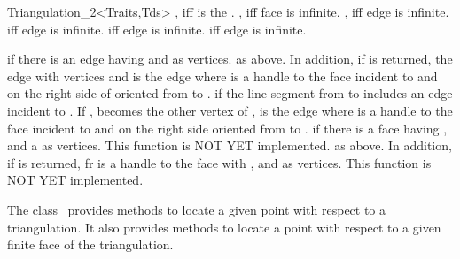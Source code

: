 \begin{ccClassTemplate}{Triangulation_2<Traits,Tds>}
{, iff  is the .}
\ccGlue
{}
{, iff face  is infinite.}
\ccGlue
{}
{, iff edge  is infinite.}
\ccGlue
{}
{ iff edge  is infinite.}
\ccGlue
{}
{ iff edge  is infinite.}
\ccGlue
{}
{ iff edge  is infinite.}


{ if there is an edge having  and  as
vertices.}
\ccGlue
{}
{ as above. In addition, if  is returned,  the edge with
vertices  and  is the edge  where
 is a handle to the face incident to  and 
on the right side of   oriented from  to .}
\ccGlue
{}
{ if the line segment from  to  includes
an edge  incident to . If ,  becomes
the other vertex of ,  is the edge  where
 is a handle to the face incident to  and 
on the right side  oriented from  to .}
\ccGlue
{}
{ if there is a face having ,  and a 
as vertices. This function is NOT YET implemented.}
\ccGlue
{}
{as above. In addition, if  is returned, fr is a handle
to the face with  ,  and  
as vertices. This function is NOT YET implemented.} 



The class \ccClassTemplateName\  provides methods to locate
a given point with respect to a triangulation. It also provides
methods to locate a point with respect to
a given  finite face of the triangulation.



\end{ccClassTemplate}
